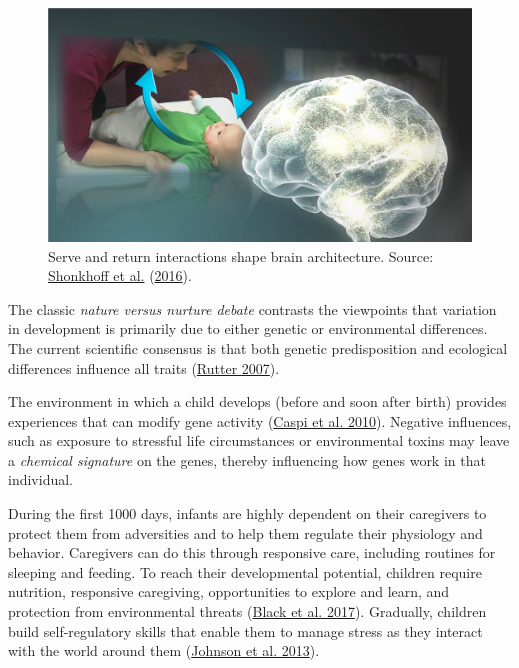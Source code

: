 \documentclass[
]{book}
\begin{document}
\begin{figure}

{\centering \includegraphics[width=1\linewidth]{fig/Shonkoff_Ch1} 

}

\caption{Serve and return interactions shape brain architecture. Source: \protect\hyperlink{ref-skonkhoff2016best}{Shonkhoff et al.} (\protect\hyperlink{ref-skonkhoff2016best}{2016}).}\label{fig:shonkoffplot}
\end{figure}



The classic \emph{nature versus nurture debate} contrasts the viewpoints that variation in development is primarily due to either genetic or environmental differences. The current scientific consensus is that both genetic predisposition and ecological differences influence all traits (\protect\hyperlink{ref-rutter2007genes}{Rutter 2007}).

The environment in which a child develops (before and soon after birth) provides experiences that can modify gene activity (\protect\hyperlink{ref-caspi2010genetic}{Caspi et al. 2010}). Negative influences, such as exposure to stressful life circumstances or environmental toxins may leave a \emph{chemical signature} on the genes, thereby influencing how genes work in that individual.

During the first 1000 days, infants are highly dependent on their caregivers to protect them from adversities and to help them regulate their physiology and behavior. Caregivers can do this through responsive care, including routines for sleeping and feeding. To reach their developmental potential, children require nutrition, responsive caregiving, opportunities to explore and learn, and protection from environmental threats (\protect\hyperlink{ref-black2017}{Black et al. 2017}). Gradually, children build self-regulatory skills that enable them to manage stress as they interact with the world around them (\protect\hyperlink{ref-johnson2013science}{Johnson et al. 2013}).
\end{document}
